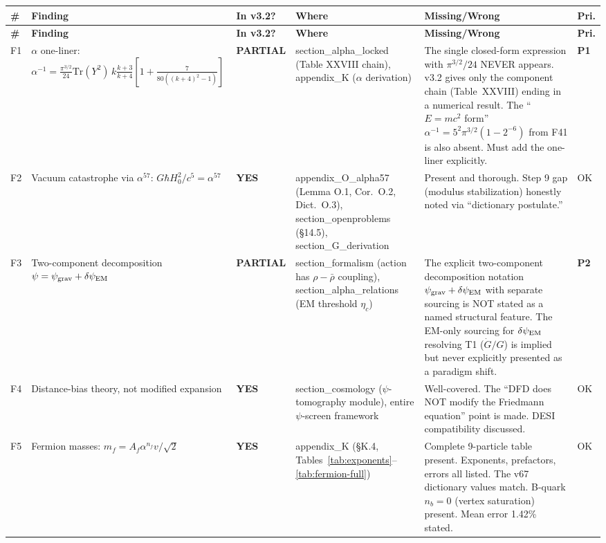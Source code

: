 \documentclass[11pt,a4paper]{article}
\newcommand{\YES}{\textcolor{yes}{\textbf{YES}}}
\newcommand{\PARTIAL}{\textcolor{partial}{\textbf{PARTIAL}}}
\begin{document}
\begin{longtable}{|p{0.5cm}|p{3.5cm}|p{1.2cm}|p{3.5cm}|p{4.5cm}|p{1cm}|}
\hline
\textbf{\#} & \textbf{Finding} & \textbf{In v3.2?} & \textbf{Where} & \textbf{Missing/Wrong} & \textbf{Pri.} \\
\hline
\endfirsthead
\hline
\textbf{\#} & \textbf{Finding} & \textbf{In v3.2?} & \textbf{Where} & \textbf{Missing/Wrong} & \textbf{Pri.} \\
\hline
\endhead

F1 & $\alpha$ one-liner: $\alpha^{-1} = \frac{\pi^{3/2}}{24}\mathrm{Tr}(Y^2)\,k\frac{k+3}{k+4}[1+\frac{7}{80((k+4)^2-1)}]$ &
\PARTIAL &
section\_alpha\_locked (Table XXVIII chain), appendix\_K ($\alpha$ derivation) &
The single closed-form expression with $\pi^{3/2}/24$ NEVER appears. v3.2 gives only the component chain (Table~XXVIII) ending in a numerical result. The ``$E=mc^2$ form'' $\alpha^{-1} = 5^2\pi^{3/2}(1-2^{-6})$ from F41 is also absent. Must add the one-liner explicitly. &
\textcolor{critical}{\textbf{P1}} \\
\hline

F2 & Vacuum catastrophe via $\alpha^{57}$: $G\hbar H_0^2/c^5 = \alpha^{57}$ &
\YES &
appendix\_O\_alpha57 (Lemma O.1, Cor.\ O.2, Dict.\ O.3), section\_openproblems (\S14.5), section\_G\_derivation &
Present and thorough. Step 9 gap (modulus stabilization) honestly noted via ``dictionary postulate.'' &
OK \\
\hline

F3 & Two-component decomposition $\psi = \psi_{\rm grav} + \delta\psi_{\rm EM}$ &
\PARTIAL &
section\_formalism (action has $\rho-\bar{\rho}$ coupling), section\_alpha\_relations (EM threshold $\eta_c$) &
The explicit two-component decomposition notation $\psi_{\rm grav} + \delta\psi_{\rm EM}$ with separate sourcing is NOT stated as a named structural feature. The EM-only sourcing for $\delta\psi_{\rm EM}$ resolving T1 ($\dot{G}/G$) is implied but never explicitly presented as a paradigm shift. &
\textbf{P2} \\
\hline

F4 & Distance-bias theory, not modified expansion &
\YES &
section\_cosmology ($\psi$-tomography module), entire $\psi$-screen framework &
Well-covered. The ``DFD does NOT modify the Friedmann equation'' point is made. DESI compatibility discussed. &
OK \\
\hline

F5 & Fermion masses: $m_f = A_f \alpha^{n_f} v/\sqrt{2}$ &
\YES &
appendix\_K (\S K.4, Tables~\ref{tab:exponents}--\ref{tab:fermion-full}) &
Complete 9-particle table present. Exponents, prefactors, errors all listed. The v67 dictionary values match. B-quark $n_b = 0$ (vertex saturation) present. Mean error 1.42\% stated. &
OK \\
\hline


\end{longtable}
\end{document}
